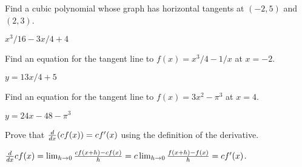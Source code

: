 \begin{exercises}

\begin{exercise} 
Find a cubic polynomial whose graph has horizontal tangents at $(-2 ,
5)$ and $(2, 3)$.
\begin{answer} $x^3/16-3x/4+4$
\end{answer}\end{exercise}

\begin{exercise}
  Find an equation for the tangent line to $f(x) = x^3/4 - 1/x$ at $x=-2$.
\begin{answer} $y=13x/4+5$
\end{answer}\end{exercise}

\begin{exercise} 
  Find an equation for the tangent line to $f(x)= 3x^2 - \pi ^3$ at
  $x= 4$.
\begin{answer} $y=24x-48-\pi^3$
\end{answer}
\end{exercise}



 
\begin{exercise} Prove that $\frac{d}{dx}(cf(x))= cf'(x)$ using the
definition of the derivative.
\end{exercise}
\begin{answer} 
$\frac{d}{dx} cf(x) = \lim_{h\to 0}\frac{cf(x+h)-cf(x)}{h} = c\lim_{h\to 0}\frac{f(x+h)-f(x)}{h} = cf'(x)$.
\end{answer}
\end{exercises}




